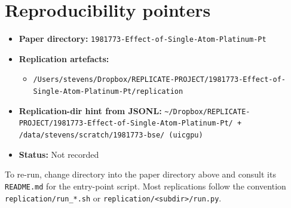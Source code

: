 \documentclass[11pt]{article}
\begin{document}
\section{Reproducibility pointers}\label{sec:repro}
\begin{itemize}
\item \textbf{Paper directory:} \texttt{1981773-Effect-of-Single-Atom-Platinum-Pt}
\item \textbf{Replication artefacts:}
\begin{itemize}
\item \texttt{/Users/stevens/Dropbox/REPLICATE-PROJECT/1981773-Effect-of-Single-Atom-Platinum-Pt/replication}
\end{itemize}
\item \textbf{Replication-dir hint from JSONL:} \texttt{\textasciitilde{}/Dropbox/REPLICATE-PROJECT/1981773-Effect-of-Single-Atom-Platinum-Pt/ + /data/stevens/scratch/1981773-bse/ (uicgpu)}
\item \textbf{Status:} Not recorded
\end{itemize}

To re-run, change directory into the paper directory above and consult its \texttt{README.md} for the entry-point script. Most replications follow the convention \texttt{replication/run\_*.sh} or \texttt{replication/<subdir>/run.py}.
\end{document}
